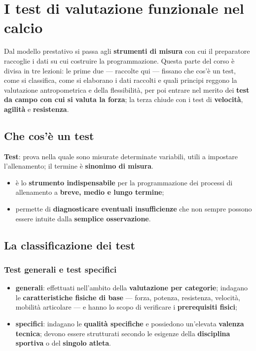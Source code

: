 \chapter{I test di valutazione funzionale nel calcio}
\label{cap:testvalutazionecalcio}

Dal modello prestativo si passa agli \textbf{strumenti di misura} con cui il preparatore raccoglie i
dati su cui costruire la programmazione. Questa parte del corso è divisa in tre lezioni: le prime
due --- raccolte qui --- fissano che cos'è un test, come si classifica, come si elaborano i dati
raccolti e quali principi reggono la valutazione antropometrica e della flessibilità, per poi
entrare nel merito dei \textbf{test da campo con cui si valuta la forza}; la terza chiude con i test
di \textbf{velocità}, \textbf{agilità} e \textbf{resistenza}.

\section{Che cos'è un test}

\textbf{Test}: prova nella quale sono misurate determinate variabili, utili a impostare
l'allenamento; il termine è \textbf{sinonimo di misura}.

\begin{itemize}
  \item è lo \textbf{strumento indispensabile} per la programmazione dei processi di allenamento a
    \textbf{breve, medio e lungo termine};
  \item permette di \textbf{diagnosticare eventuali insufficienze} che non sempre possono essere
    intuite dalla \textbf{semplice osservazione}.
\end{itemize}

\section{La classificazione dei test}

\subsection{Test generali e test specifici}

\begin{itemize}
  \item \textbf{generali}: effettuati nell'ambito della \textbf{valutazione per categorie};
    indagano le \textbf{caratteristiche fisiche di base} --- forza, potenza, resistenza, velocità,
    mobilità articolare --- e hanno lo scopo di verificare i \textbf{prerequisiti fisici};
  \item \textbf{specifici}: indagano le \textbf{qualità specifiche} e possiedono un'elevata
    \textbf{valenza tecnica}; devono essere strutturati secondo le esigenze della \textbf{disciplina
    sportiva} o del \textbf{singolo atleta}.
\end{itemize}

